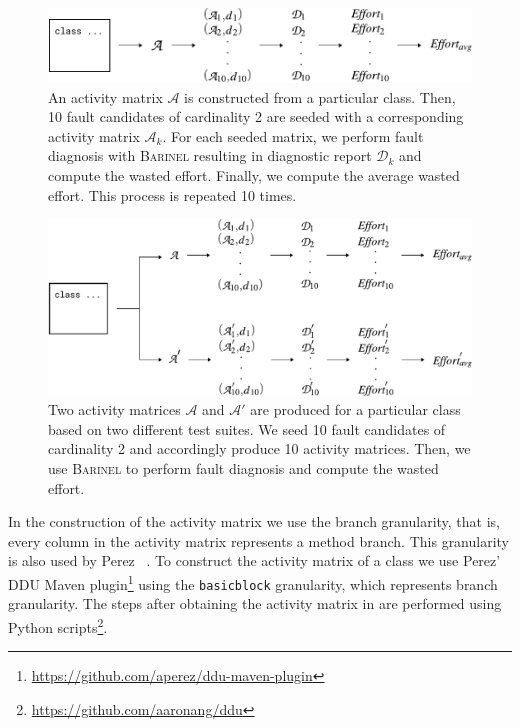 \documentclass[twoside,a4paper,11pt]{memoir}
\begin{document}
\begin{figure}
  \includegraphics[width=\linewidth]{figures/effort_approach}
  \caption{An activity matrix \(\mathcal{A} \) is constructed from a particular class. Then, 10 fault candidates of cardinality 2 are seeded with a corresponding activity matrix \(\mathcal{A}_k \). For each seeded matrix, we perform fault diagnosis with \textsc{Barinel} resulting in diagnostic report \(\mathcal{D}_k \) and compute the wasted effort. Finally, we compute the average wasted effort. This process is repeated 10 times.}%
  \label{fig:fault_generation}
\end{figure}

\begin{figure}
  \includegraphics[width=\linewidth]{figures/delta_effort_approach}
  \caption{Two activity matrices \(\mathcal{A} \) and \(\mathcal{A}' \) are produced for a particular class based on two different test suites. We seed 10 fault candidates of cardinality 2 and accordingly produce 10 activity matrices. Then, we use \textsc{Barinel} to perform fault diagnosis and compute the wasted effort.}%
  \label{fig:fault_generation_delta}
\end{figure}

In the construction of the activity matrix we use the branch granularity, that is, every column in the activity matrix represents a method branch.
This granularity is also used by Perez \etal~\cite{DBLP:conf/icse/PerezAD17}.
To construct the activity matrix of a class we use Perez' DDU Maven plugin\footnote{\url{https://github.com/aperez/ddu-maven-plugin}} using the \texttt{basicblock} granularity, which represents branch granularity.
The steps after obtaining the activity matrix in  are performed using Python scripts\footnote{\url{https://github.com/aaronang/ddu}}.
\end{document}
